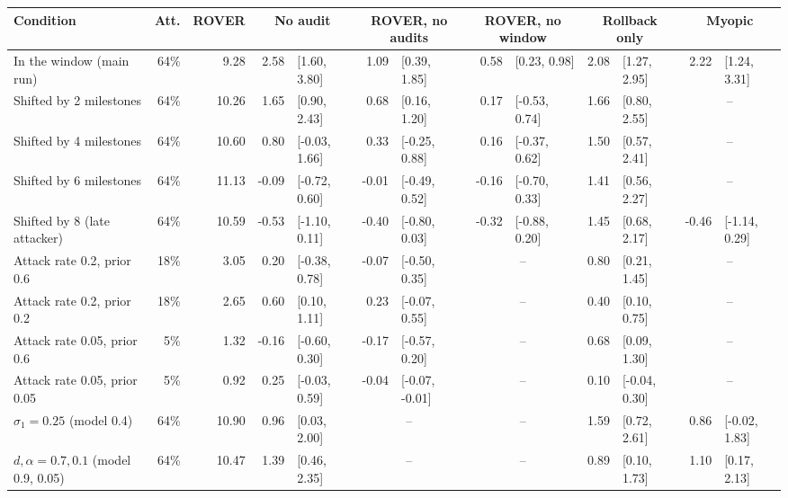 \scriptsize
\setlength{\tabcolsep}{2.6pt}
\begin{tabular}{@{}l r r r@{\,}l r@{\,}l r@{\,}l r@{\,}l r@{\,}l@{}}
\toprule
Condition & Att. & ROVER & \multicolumn{2}{c}{No audit} & \multicolumn{2}{c}{ROVER, no audits} & \multicolumn{2}{c}{ROVER, no window} & \multicolumn{2}{c}{Rollback only} & \multicolumn{2}{c}{Myopic} \\
\midrule
In the window (main run) & 64\% & 9.28 & 2.58 & [1.60, 3.80] & 1.09 & [0.39, 1.85] & 0.58 & [0.23, 0.98] & 2.08 & [1.27, 2.95] & 2.22 & [1.24, 3.31] \\
Shifted by 2 milestones & 64\% & 10.26 & 1.65 & [0.90, 2.43] & 0.68 & [0.16, 1.20] & 0.17 & [-0.53, 0.74] & 1.66 & [0.80, 2.55] & \multicolumn{2}{c}{--} \\
Shifted by 4 milestones & 64\% & 10.60 & 0.80 & [-0.03, 1.66] & 0.33 & [-0.25, 0.88] & 0.16 & [-0.37, 0.62] & 1.50 & [0.57, 2.41] & \multicolumn{2}{c}{--} \\
Shifted by 6 milestones & 64\% & 11.13 & -0.09 & [-0.72, 0.60] & -0.01 & [-0.49, 0.52] & -0.16 & [-0.70, 0.33] & 1.41 & [0.56, 2.27] & \multicolumn{2}{c}{--} \\
Shifted by 8 (late attacker) & 64\% & 10.59 & -0.53 & [-1.10, 0.11] & -0.40 & [-0.80, 0.03] & -0.32 & [-0.88, 0.20] & 1.45 & [0.68, 2.17] & -0.46 & [-1.14, 0.29] \\
\midrule
Attack rate 0.2, prior 0.6 & 18\% & 3.05 & 0.20 & [-0.38, 0.78] & -0.07 & [-0.50, 0.35] & \multicolumn{2}{c}{--} & 0.80 & [0.21, 1.45] & \multicolumn{2}{c}{--} \\
Attack rate 0.2, prior 0.2 & 18\% & 2.65 & 0.60 & [0.10, 1.11] & 0.23 & [-0.07, 0.55] & \multicolumn{2}{c}{--} & 0.40 & [0.10, 0.75] & \multicolumn{2}{c}{--} \\
Attack rate 0.05, prior 0.6 & 5\% & 1.32 & -0.16 & [-0.60, 0.30] & -0.17 & [-0.57, 0.20] & \multicolumn{2}{c}{--} & 0.68 & [0.09, 1.30] & \multicolumn{2}{c}{--} \\
Attack rate 0.05, prior 0.05 & 5\% & 0.92 & 0.25 & [-0.03, 0.59] & -0.04 & [-0.07, -0.01] & \multicolumn{2}{c}{--} & 0.10 & [-0.04, 0.30] & \multicolumn{2}{c}{--} \\
\midrule
$\sigma_1=0.25$ (model 0.4) & 64\% & 10.90 & 0.96 & [0.03, 2.00] & \multicolumn{2}{c}{--} & \multicolumn{2}{c}{--} & 1.59 & [0.72, 2.61] & 0.86 & [-0.02, 1.83] \\
$d,\alpha=0.7,0.1$ (model 0.9, 0.05) & 64\% & 10.47 & 1.39 & [0.46, 2.35] & \multicolumn{2}{c}{--} & \multicolumn{2}{c}{--} & 0.89 & [0.10, 1.73] & 1.10 & [0.17, 2.13] \\
\bottomrule
\end{tabular}
